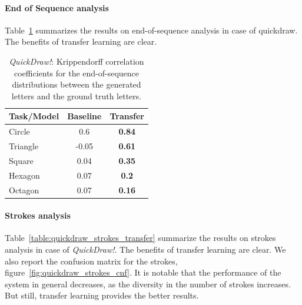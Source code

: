       \paragraph{End of Sequence analysis}
        Table~\ref{table:quickdraw_eos_transfer} summarizes the results on end-of-sequence analysis in case of quickdraw. The benefits of transfer learning are clear.
        \begin{table}[!htbp]
          \centering
          \begin{tabular}{l c c} \hline

          Task/Model & Baseline & Transfer \\ \hline
          Circle &  0.6 & \textbf{0.84} \\ %
          Triangle & -0.05 & \textbf{0.61} \\ %
          Square &  0.04 &  \textbf{0.35} \\ %
          Hexagon &  0.07 &  \textbf{0.2} \\ %
          Octagon &  0.07 &  \textbf{0.16} \\ \hline

          \end{tabular}
          \caption{\textit{QuickDraw!}: Krippendorff correlation coefficients for the end-of-sequence distributions between the generated letters and the ground truth letters.}
          \label{table:quickdraw_eos_transfer}
        \end{table}

      \paragraph{Strokes analysis}
        Table~\ref{table:quickdraw_strokes_transfer} summarize the results on strokes analysis in case of \textit{QuickDraw!}. The benefits of transfer learning are clear. We also report the confusion matrix for the strokes, figure~\ref{fig:quickdraw_strokes_cnf}. It is notable that the performance of the system in general decreases, as the diversity in the number of strokes increases. But still, transfer learning provides the better results.

